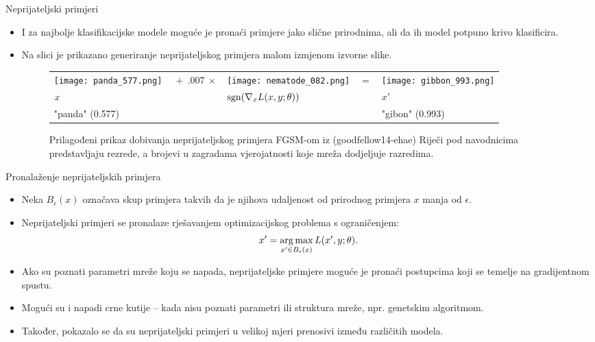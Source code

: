 \documentclass{beamer}
\begin{document}
\begin{frame}{Neprijateljski primjeri}	
\begin{itemize}
	\item I za najbolje klasifikacijske modele moguće je pronaći primjere jako slične prirodnima, ali da ih model potpuno krivo klasificira.
	\item Na slici je prikazano generiranje neprijateljskog primjera malom izmjenom izvorne slike.	
	\begin{figure}[htbp]
		\centering
		\begin{tabular}{>{\centering\arraybackslash}m{}m{.5in}>{\centering\arraybackslash}m{}m{.1in}>{\centering\arraybackslash}m{}}
			\centering\arraybackslash
			\texttt{[image: panda\_577.png]} &%
			\centering\arraybackslash%
			$\ +\ .007\ \times$ &%
			\texttt{[image: nematode\_082.png]} &%
			$=$ & %
			\texttt{[image: gibbon\_993.png]} \\
			$\centering x$     &%
			& $\operatorname{sgn} (\nabla_x L(x, y; \theta) )$ & & $x'$ \\
			"panda" (0.577) & & & & "gibon" (0.993) 
		\end{tabular}
		\caption{Prilagođeni prikaz dobivanja neprijateljskog primjera FGSM-om iz (goodfellow14-ehae) Riječi pod navodnicima predstavljaju rezrede, a brojevi u zagradama vjerojatnosti koje mreža dodjeljuje razredima.}
		\label{panda}
	\end{figure}	
\end{itemize}
\end{frame}
\note[itemize]{}

\begin{frame}{Pronalaženje neprijateljskih primjera}
	\begin{itemize}
		\item Neka $ B_\epsilon(x)$ označava skup primjera takvih da je njihova udaljenost od prirodnog primjera $x$ manja od $\epsilon$. 
		\item Neprijateljski primjeri se pronalaze rješavanjem optimizacijskog problema s ograničenjem:
		\begin{equation}
		x' = \operatorname*{arg\,max}_{x'\in B_\epsilon(x)} L(x', y; \theta).
		\end{equation}
		\item Ako su poznati parametri mreže koju se napada, neprijateljske primjere moguće je pronaći postupcima koji se temelje na gradijentnom spustu.
		\item Mogući su i napadi crne kutije -- kada nisu poznati parametri ili struktura mreže, npr. genetskim algoritmom.
		\item Također, pokazalo se da su neprijateljski primjeri u velikoj mjeri prenosivi između različitih modela.
	\end{itemize}
\end{frame}
\end{document}
